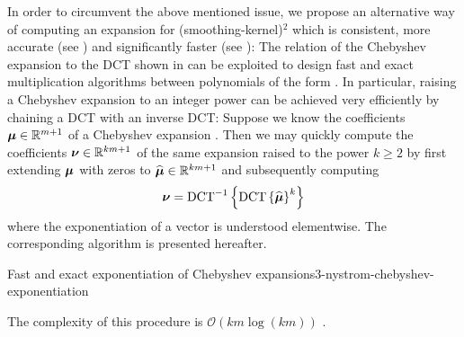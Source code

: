 In order to circumvent the above mentioned issue, we propose an alternative way of computing
an expansion for (\gls{smoothing-kernel})$^2$ which is consistent,
more accurate (see ) and significantly
faster (see ):
The relation of the Chebyshev expansion to the \gls{DCT} shown in 
can be exploited to design fast and exact multiplication algorithms between polynomials
of the form  \cite[proposition~3.1]{baszenski1997cosine}.
In particular, raising a Chebyshev expansion to an integer power can be achieved
very efficiently by chaining a \gls{DCT} with an inverse \gls{DCT}:
Suppose we know the coefficients $\boldsymbol{\mu} \in \mathbb{R}^{m+1}$
of a Chebyshev expansion .
Then we may quickly compute the coefficients $\boldsymbol{\nu} \in \mathbb{R}^{km+1}$
of the same expansion raised to the power $k \geq 2$ by first extending
$\boldsymbol{\mu}$ with zeros to $\widehat{\boldsymbol{\mu}} \in \mathbb{R}^{km+1}$
and subsequently computing
\begin{equation}
    \boldsymbol{\nu} = \operatorname{DCT}^{-1}\left\{ \operatorname{DCT}\left\{\widehat{\boldsymbol{\mu}}\right\}^{k} \right\}
    \label{equ:3-nystrom-chebyshev-potentiate-coefficients}
\end{equation}
where the exponentiation of a vector is understood elementwise.
The corresponding algorithm is presented hereafter.
\begin{algo}{Fast and exact exponentiation of Chebyshev expansions}{3-nystrom-chebyshev-exponentiation}
    
\end{algo}
The complexity of this procedure is $\mathcal{O}(km \log(km))$ \cite{makhoul1980fct}.\\
\begin{table}[ht]
    \caption{Comparison of the runtime in milliseconds of three approaches with which the coefficients
    of the Chebyshev expansion of a function can be computed. We average over 7 runs of the
    algorithms and repeat these runs 100 times to form the mean and standard
    deviation which are given in the below table. We refer to the interpolation
    of (\gls{smoothing-kernel})$^{2}$ with \cite[algorithm~1]{lin2017randomized} as \enquote{quadrature},
    to the interpolation of (\gls{smoothing-kernel})$^{2}$ with  as \enquote{DCT},
    and finally to the consistent squaring algorithm  as \enquote{squaring}.
    For each algorithm, we interpolate a Gaussian \gls{smoothing-kernel} with \gls{smoothing-parameter} $=0.05$,
    at \gls{num-evaluation-points} $=1000$ points, for various values of \gls{chebyshev-degree}.}
    \label{tab:3-nystrom-timing-squared-interpolation}
    
\end{table}

